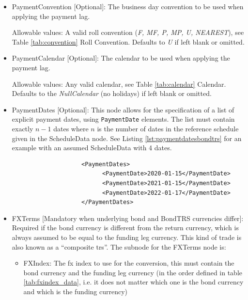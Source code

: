 \begin{itemize}
\begin{itemize}
  Allowable values: \lstinline!Adjusted! or \lstinline!Unadjusted!. Defaults to \lstinline!Adjusted! if omitted.

  \item PaymentConvention [Optional]: The business day convention to be used when applying the payment lag.

    Allowable values: A valid roll convention (\emph{F, MF, P, MP, U, NEAREST}), see Table \ref{tab:convention} Roll Convention. Defaults to \emph{U} if left blank or omitted.

  \item PaymentCalendar [Optional]: The calendar to be used when applying the payment lag.

    Allowable values: Any valid calendar, see Table \ref{tab:calendar} Calendar. Defaults to the \emph{NullCalendar} (no holidays) if left blank or omitted.

  \item PaymentDates [Optional]: This node allows for the specification of a list of explicit payment dates, using \lstinline!PaymentDate! elements.
    The list must contain exactly $n-1$ dates where $n$ is the number of dates in the reference schedule given in the ScheduleData node.
    See Listing \ref{lst:paymentdatesbondtrs} for an example with an assumed ScheduleData with 4 dates.

  \begin{listing}[H]
    \begin{verbatim}
                    <PaymentDates>
                          <PaymentDate>2020-01-15</PaymentDate>
                          <PaymentDate>2021-01-15</PaymentDate>
                          <PaymentDate>2022-01-17</PaymentDate>
                    </PaymentDates>
    \end{verbatim}
    \caption{Payment dates}
    \label{lst:paymentdatesbondtrs}
  \end{listing}


  \item FXTerms [Mandatory when underlying bond and BondTRS currencies differ]: Required if the bond currency is different from the return currency, which is always
    assumed to be equal to the funding leg currency. This kind of trade is also known as a ``composite trs''. The
    subnode for the FXTerms node is:
    \begin{itemize}
      \item FXIndex: The fx index to use for the conversion, this must contain the bond currency and the funding leg
        currency (in the order defined in table \ref{tab:fxindex_data}, i.e. it does not matter which one is the bond currency and which is the funding currency)


\end{itemize}
\end{itemize}
\end{itemize}
